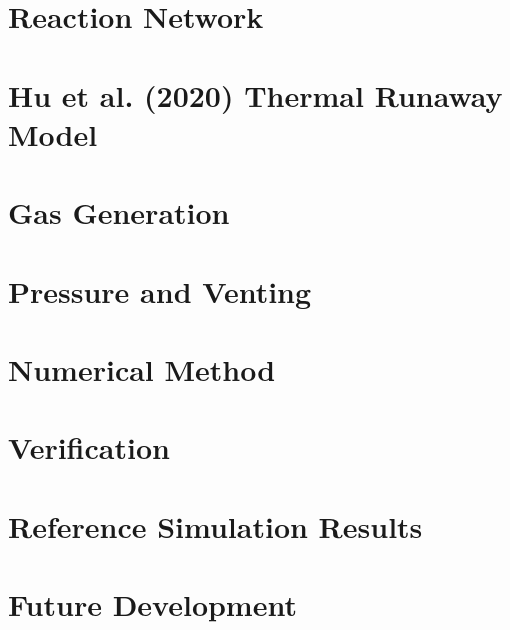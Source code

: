 \documentclass[11pt,a4paper]{article}
\begin{document}
\section{Reaction Network}
\label{sec:reactions}


\section{Hu et al. (2020) Thermal Runaway Model}
\label{sec:hu2020}


\section{Gas Generation}
\label{sec:gases}


\section{Pressure and Venting}
\label{sec:pressure-venting}


\section{Numerical Method}
\label{sec:numerical-method}


\section{Verification}
\label{sec:verification}


\section{Reference Simulation Results}
\label{sec:results}


\section{Future Development}
\label{sec:future-work}


\newpage

\printbibliography
\end{document}
